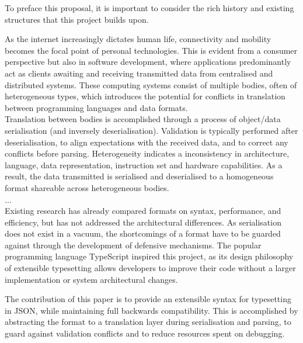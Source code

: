 \documentclass[../report.tex]{subfiles}
\begin{document}
To preface this proposal, it is important to consider the rich history and existing structures that this project builds upon.





As the internet increasingly dictates human life, connectivity and mobility becomes the focal point of personal technologies. This is evident from a consumer perspective but also in software development, where applications predominantly act as clients awaiting and receiving transmitted data from centralised and distributed systems. These computing systems consist of multiple bodies, often of heterogeneous types, which introduces the potential for conflicts in translation between programming languages and data formats. \\

Translation between bodies is accomplished through a process of object/data serialisation (and inversely deserialisation). Validation is typically performed after deserialisation, to align expectations with the received data, and to correct any conflicts before parsing. Heterogeneity indicates a inconsistency in architecture, language, data representation, instruction set and hardware capabilities. As a result, the data transmitted is serialised and deserialised to a homogeneous format shareable across heterogeneous bodies. \\

... \\

Existing research has already compared formats on syntax, performance, and efficiency, but has not addressed the architectural differences. As serialisation does not exist in a vacuum, the shortcomings of a format have to be guarded against through the development of defensive mechanisms. The popular programming language TypeScript inspired this project, as its design philosophy of extensible typesetting allows developers to improve their code without a larger implementation or system architectural changes.

The contribution of this paper is to provide an extensible syntax for typesetting in JSON, while maintaining full backwards compatibility. This is accomplished by abstracting the format to a translation layer during serialisation and parsing, to guard against validation conflicts and to reduce resources spent on debugging.
\end{document}
